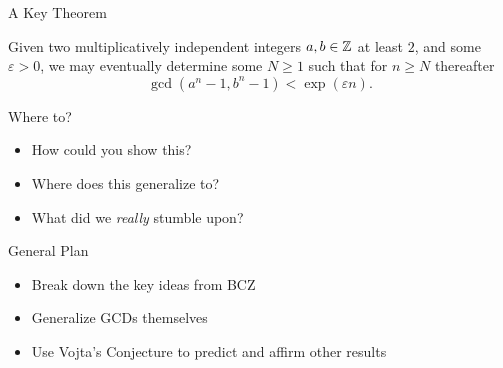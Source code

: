 \documentclass{beamer}
\begin{document}
\begin{frame}{A Key Theorem}

    \begin{theorem}
        Given two multiplicatively independent integers $a, b \in \mathbb{Z}$ at least $2$, and some $\varepsilon > 0$,
        we may eventually determine some $N \geq 1$ such that for $n \geq N$ thereafter
        \[
            \gcd(a^n - 1, b^n - 1) < \exp(\varepsilon n).
        \]
    \end{theorem}
\end{frame}

\begin{frame}{Where to?}

    \begin{itemize}
        \item How could you show this?
        \item Where does this generalize to?
        \item What did we \textit{really} stumble upon?
    \end{itemize}
\end{frame}

\begin{frame}{General Plan}

    \begin{itemize}
        \item Break down the key ideas from BCZ
        \item Generalize GCDs themselves
        \item Use Vojta's Conjecture to predict and affirm other results
    \end{itemize}
\end{frame}
\end{document}
